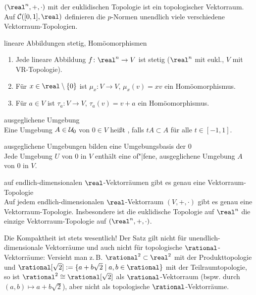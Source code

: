 \begin{Bsp}
    $(\real^n, +, \cdot)$ mit der euklidischen Topologie ist ein topologischer
    Vektorraum. \\
    Auf $\C([0, 1], \real)$ definieren die $p$-Normen unendlich viele
    verschiedene Vektorraum-Topologien.
\end{Bsp}

\begin{Satz}{lineare Abbildungen stetig, Homöomorphismen}
    \begin{enumerate}
        \item
        Jede lineare Abbildung $f\colon \real^n \rightarrow V$ ist stetig
        ($\real^n$ mit eukl., $V$ mit VR-Topologie).
        
        \item
        Für $x \in \real \setminus \{0\}$ ist $\mu_x\colon V \rightarrow V$,
        $\mu_x(v) = xv$ ein Homöomorphismus.
        
        \item
        Für $a \in V$ ist $\tau_a\colon V \rightarrow V$, $\tau_a(v) = v + a$
        ein Homöomorphismus.
    \end{enumerate}
\end{Satz}

\begin{Def}{ausgeglichene Umgebung}\\
    Eine Umgebung $A \in \mathcal{U}_0$ von $0 \in V$ heißt ,
    falls $tA \subset A$ für alle $t \in [-1, 1]$.
\end{Def}

\begin{Lemma}{ausgeglichene Umgebungen bilden eine Umgebungsbasis der $0$}\\
    Jede Umgebung $U$ von $0$ in $V$ enthält eine of"|fene,
    ausgeglichene Umgebung $A$ von $0$ in $V$.
\end{Lemma}

\begin{Satz}{auf endlich-dimensionalen $\real$-Vektorräumen gibt es genau
             eine Vektorraum-Topologie}\\
    Auf jedem endlich-dimensionalen $\real$-Vektorraum $(V, +, \cdot)$
    gibt es genau eine Vektorraum-Topo\-logie.
    Insbesondere ist die euklidische Topologie auf $\real^n$ die einzige
    Vektorraum-Topologie auf $(\real^n, +, \cdot)$.
\end{Satz}

\begin{Bem}
    Die Kompaktheit ist stets wesentlich!
    Der Satz gilt nicht für unendlich-dimensionale Vektorräume
    und auch nicht für topologische $\rational$-Vektorräume:
    Versieht man z.\,B. $\rational^2 \subset \real^2$ mit der Produkttopologie
    und $\rational[\sqrt{2}] := \{a + b\sqrt{2} \;|\; a, b \in \rational\}$
    mit der Teilraumtopologie, so ist $\rational^2 \cong \rational[\sqrt{2}]$
    als $\rational$-Vektorraum (bspw. durch $(a, b) \mapsto a + b \sqrt{2}$),
    aber nicht als topologische $\rational$-Vektorräume.
\end{Bem}

